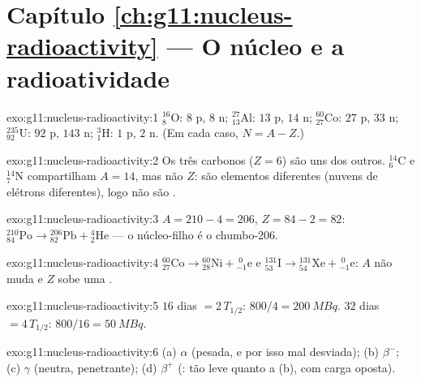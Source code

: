 \section*{Capítulo \ref{ch:g11:nucleus-radioactivity} --- O núcleo e a radioatividade}

\begin{solution}{exo:g11:nucleus-radioactivity:1}
${}^{16}_{8}\mathrm{O}$: $8$ p, $8$ n; ${}^{27}_{13}\mathrm{Al}$: $13$ p,
$14$ n; ${}^{60}_{27}\mathrm{Co}$: $27$ p, $33$ n;
${}^{235}_{92}\mathrm{U}$: $92$ p, $143$ n; ${}^{3}_{1}\mathrm{H}$: $1$ p,
$2$ n. (Em cada caso, $N = A - Z$.)
\end{solution}

\begin{solution}{exo:g11:nucleus-radioactivity:2}
Os três carbonos ($Z = 6$) são  uns dos outros.
${}^{14}_{6}\mathrm{C}$ e ${}^{14}_{7}\mathrm{N}$ compartilham $A = 14$,
mas não $Z$: são elementos diferentes (nuvens de elétrons diferentes),
logo não são .
\end{solution}

\begin{solution}{exo:g11:nucleus-radioactivity:3}
$A = 210 - 4 = 206$, $Z = 84 - 2 = 82$:
${}^{210}_{84}\mathrm{Po} \to {}^{206}_{82}\mathrm{Pb} +
{}^{4}_{2}\mathrm{He}$ --- o núcleo-filho é o chumbo-206.
\end{solution}

\begin{solution}{exo:g11:nucleus-radioactivity:4}
${}^{60}_{27}\mathrm{Co} \to {}^{60}_{28}\mathrm{Ni} +
{}^{\;0}_{-1}\mathrm{e}$ e
${}^{131}_{53}\mathrm{I} \to {}^{131}_{54}\mathrm{Xe} +
{}^{\;0}_{-1}\mathrm{e}$: $A$ não muda e $Z$ sobe uma .
\end{solution}

\begin{solution}{exo:g11:nucleus-radioactivity:5}
$16$ dias $= 2\,T_{1/2}$: $800/4 = \qty{200}{MBq}$. $32$ dias
$= 4\,T_{1/2}$: $800/16 = \qty{50}{MBq}$.
\end{solution}

\begin{solution}{exo:g11:nucleus-radioactivity:6}
(a) $\alpha$ (pesada, e por isso mal desviada); (b) $\beta^-$;
(c) $\gamma$ (neutra, penetrante); (d) $\beta^+$ (: tão leve
quanto a (b), com carga oposta).
\end{solution}

